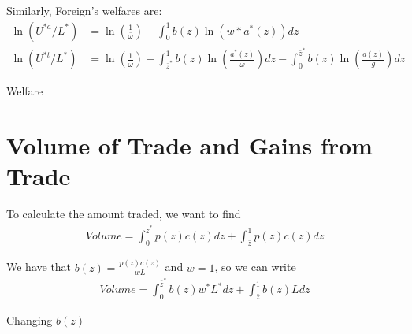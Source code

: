 \documentclass[11pt]{article}
\begin{document}
Similarly, Foreign's welfares are:
\begin{align*}
    \ln (U^{* a} / L^*) &=\ln \left(\frac{1}{\bar{\omega}}\right)-\int_{0}^{1} b(z) \ln (w* a^*(z)) dz \\
    \ln (U^{* t} / L^*) &= \ln \left(\frac{1}{\bar{\omega}}\right) -\int_{\bar{z}^*}^{1} b(z) \ln \left(\frac{a^*(z)}{\bar{\omega}}\right) d z-\int_{0}^{\bar{z}^*} b(z) \ln \left(\frac{a(z) }{g}\right) d z
\end{align*}


\begin{table}[H]
    \centering
    \caption{Welfare}
    
\end{table}

\section{Volume of Trade and Gains from Trade}
To calculate the amount traded, we want to find 
\begin{align*}
    Volume =\int_{0}^{\bar{z}^{*}} p(z) c(z) d z + \int_{\bar{z}}^{1} p(z) c(z) d z
\end{align*}

We have that $b(z) = \frac{p(z)c(z)}{wL}$ and $w = 1$, so we can write 
\begin{align*}
    Volume = \int_{0}^{\bar{z}^{*}} b(z) w^* L^{*} d z+\int_{\bar{z}}^{1} b(z) L d z
\end{align*}

\begin{table}[H]
    \centering
    \caption{Changing $b(z)$}
    
\end{table}
\end{document}
